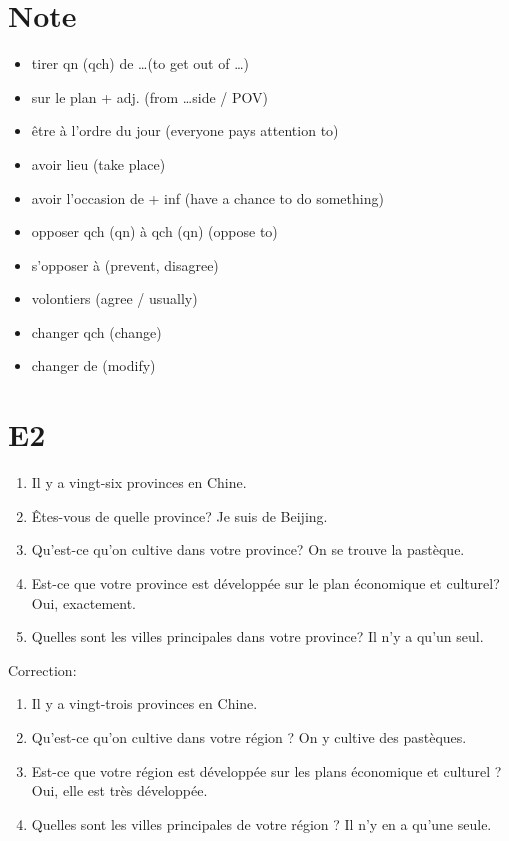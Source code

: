 \documentclass{book}
\begin{document}
    \section{Note}
        \begin{itemize}
            \item tirer qn (qch) de \dots (to get out of \dots)
            \item sur le plan + adj. (from \dots side / POV)
            \item être à l'ordre du jour (everyone pays attention to)
            \item avoir lieu (take place)
            \item avoir l'occasion de + inf (have a chance to do something)
            \item opposer qch (qn) à qch (qn) (oppose to)
            \item s'opposer à (prevent, disagree)
            \item volontiers (agree / usually)
            \item changer qch (change)
            \item changer de (modify)
        \end{itemize}

    \section{E2}
        \begin{enumerate}
            \item Il y a vingt-six provinces en Chine.
            \item Êtes-vous de quelle province? Je suis de Beijing.
            \item Qu'est-ce qu'on cultive dans votre province? On se trouve la pastèque.
            \item Est-ce que votre province est développée sur le plan économique et culturel? Oui, exactement.
            \item Quelles sont les villes principales dans votre province? Il n'y a qu'un seul.
        \end{enumerate}
        Correction:
        \begin{enumerate}
            \item Il y a vingt-trois provinces en Chine.
            \item Qu'est-ce qu'on cultive dans votre région ? On y cultive des pastèques.
            \item Est-ce que votre région est développée sur les plans économique et culturel ? Oui, elle est très développée.
            \item Quelles sont les villes principales de votre région ? Il n'y en a qu'une seule.
        \end{enumerate}
\end{document}
